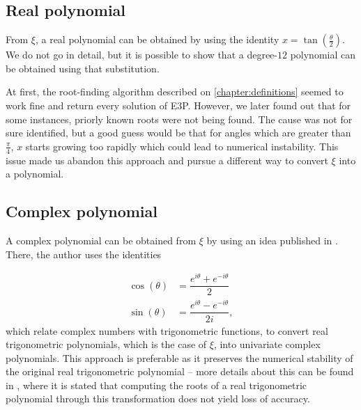 
\subsection{Real polynomial}

From $\xi$, a real polynomial can be obtained by using the identity $x = \tan{(\frac{\theta}{2})}$. We do not go in detail, but it is possible to show that a degree-$12$ polynomial can be obtained using that substitution.


At first,  the root-finding algorithm described on \autoref{chapter:definitions} seemed to work fine and return every solution of E3P. However, we later found out that for some instances, priorly known roots were not being found. The cause was not for sure identified, but a good guess would be that for angles which are greater than $\frac{\pi}{4}$, $x$ starts growing too rapidly which could lead to numerical instability. This issue made us abandon this approach and pursue a different way to convert $\xi$ into a polynomial.

\subsection{Complex polynomial}

A complex polynomial can be obtained from $\xi$ by using an idea published in . There, the author uses the identities

\begin{align}\label{eq:complex_trig_cos}
	\cos{(\theta)} &= \dfrac{e^{i\theta} + e^{-i\theta}}{2}\\
	\label{eq:complex_trig_sin}
	\sin{(\theta)} &= \dfrac{e^{i\theta} - e^{-i\theta}}{2i},
\end{align}
which relate complex numbers with trigonometric functions, to convert real trigonometric polynomials, which is the case of $\xi$, into univariate complex polynomials.
This approach is preferable as it preserves the numerical stability of the original real trigonometric polynomial -- more details about this can be found in , where it is stated that computing the roots of a real trigonometric polynomial through this transformation does not yield loss of accuracy.

